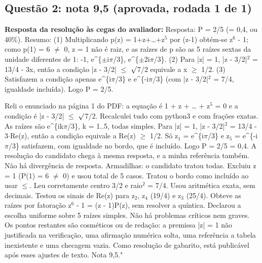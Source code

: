 \documentclass{article}%
\begin{document}
\subsection*{Questão 2: nota 9,5 (aprovada, rodada 1 de 1)}%
\textbf{Resposta da resolução às cegas do avaliador:} Resposta: P = 2/5 (= 0,4, ou 40\%).\newline%
\newline%
Resumo: (1) Multiplicando p(z) = 1+z+\ldots{}+z$^{5}$ por (z-1) obtém{-}se z$^{6}$ - 1; como p(1) = 6 $\neq$ 0, z = 1 não é raiz, e as raízes de p são as 5 raízes sextas da unidade diferentes de 1: -1, e\^{}\{$\pm$i$\pi$/3\}, e\^{}\{$\pm$2i$\pi$/3\}. (2) Para |z| = 1, |z - 3/2|$^2$ = 13/4 - 3x, então a condição |z - 3/2| $\leq$ $\surd$7/2 equivale a x $\geq$ 1/2. (3) Satisfazem a condição apenas e\^{}\{i$\pi$/3\} e e\^{}\{-i$\pi$/3\} (com |z - 3/2|$^2$ = 7/4, igualdade incluída). Logo P = 2/5.\par %
Reli o enunciado na página 1 do PDF: a equação é 1 + z + \ldots{} + z$^{5}$ = 0 e a condição é |z - 3/2| $\leq$ $\surd$7/2. Recalculei tudo com python3 e com frações exatas. As raízes são e\^{}\{ik$\pi$/3\}, k = 1..5, todas simples. Para |z| = 1, |z - 3/2|$^2$ = 13/4 - 3$\cdot$Re(z), então a condição equivale a Re(z) $\geq$ 1/2. Só z$_{1}$ = e\^{}\{i$\pi$/3\} e z$_{5}$ = e\^{}\{-i$\pi$/3\} satisfazem, com igualdade no bordo, que é incluído. Logo P = 2/5 = 0,4. A resolução do candidato chega à mesma resposta, e a minha referência também. Não há divergência de resposta.\newline%
\newline%
Armadilhas: o candidato tratou todas. Excluiu z = 1 (P(1) = 6 $\neq$ 0) e usou total de 5 casos. Tratou o bordo como incluído ao usar $\leq$. Leu corretamente centro 3/2 e raio$^2$ = 7/4. Usou aritmética exata, sem decimais. Testou os sinais de Re(z) para z$_{2}$, z$_{4}$ (19/4) e z$_{3}$ (25/4). Obteve as raízes por fatoração z$^{6}$ - 1 = (z - 1)P(z), sem resolver a quíntica. Declarou a escolha uniforme sobre 5 raízes simples.\newline%
\newline%
Não há problemas críticos nem graves. Os pontos restantes são cosméticos ou de redação: a premissa |z| = 1 não justificada na verificação, uma afirmação numérica solta, uma referência a tabela inexistente e uma checagem vazia. Como resolução de gabarito, está publicável após esses ajustes de texto. Nota 9,5."%
\end{document}
